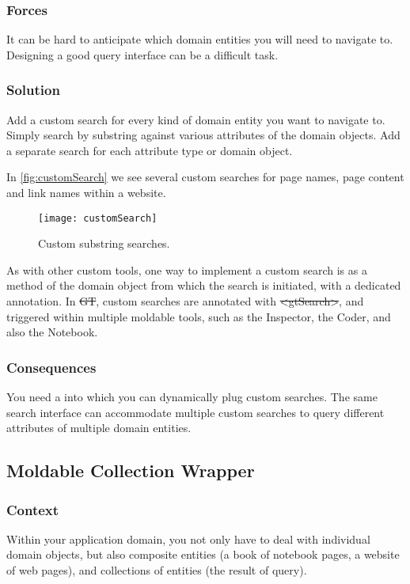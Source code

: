 \documentclass[sigconf]{acmart}
\newcommand{\pattern}[1]{\emph{\nameref{pat:#1}}\xspace}
\newcommand{\GT}{\st{GT}\xspace} %
\begin{document}
\subsubsection*{Forces}
It can be hard to anticipate which domain  entities you will need to navigate to.
Designing a good query interface can be a difficult task.

\subsubsection*{Solution}
Add a custom search for every kind of domain entity you want to navigate to.
Simply search by substring against various attributes of the domain objects.
Add a separate search for each attribute type or domain object.

In \autoref{fig:customSearch} we see several custom searches for page names, page content and link names within a website.

\begin{figure}[h]
  \texttt{[image: customSearch]}
  \caption{Custom substring searches.}
  \label{fig:customSearch}
\end{figure}

As with other custom tools, one way to implement a custom search is as a method of the domain object from which the search is initiated, with a dedicated annotation.
In \GT, custom searches are annotated with \st{<gtSearch>}, and triggered within multiple moldable tools, such as the Inspector, the Coder, and also the Notebook.

\subsubsection*{Consequences}
You need a \pattern{moldableTool} into which you can dynamically plug custom searches.
The same search interface can accommodate multiple custom searches to query different attributes of multiple domain entities.

\subsection*{Moldable Collection Wrapper}\label{pat:collectionWrapper}

\subsubsection*{Context}
Within your application domain, you not only have to deal with individual domain objects, but also composite entities (\eg a book of notebook pages, a website of web pages), and collections of entities (\eg the result of query).
\end{document}
